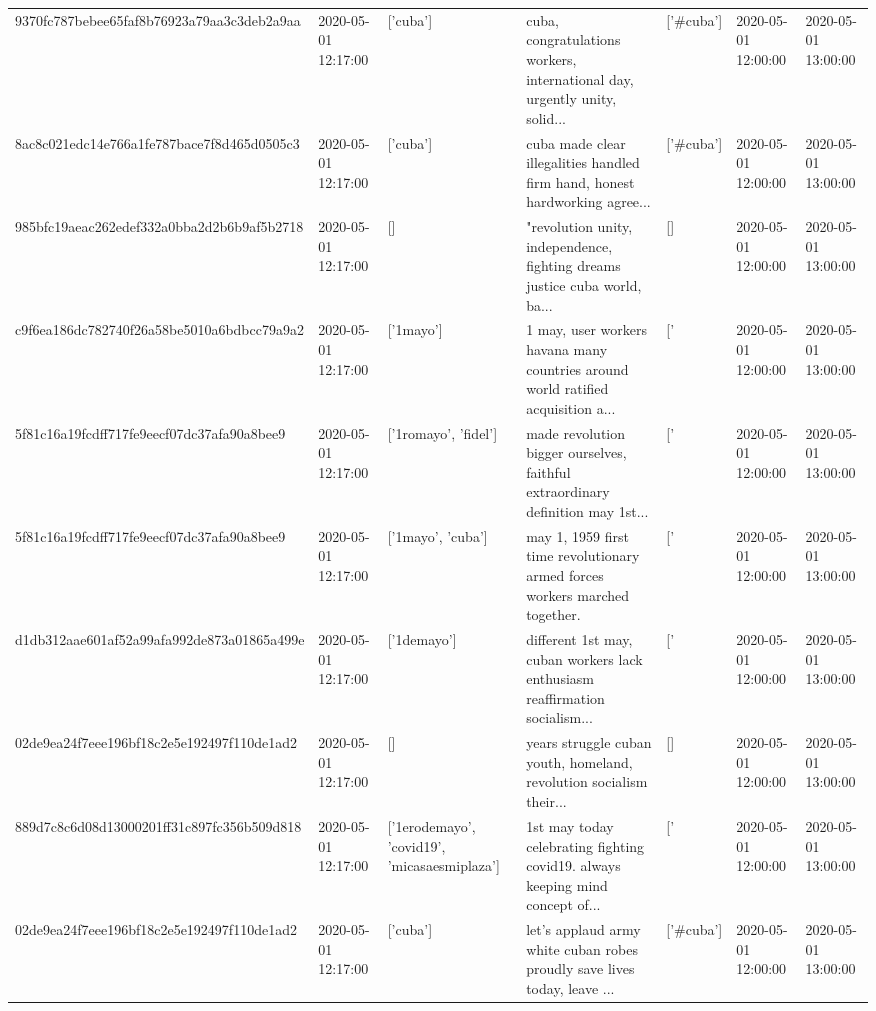 \begin{tabular}{lllllll}
9370fc787bebee65faf8b76923a79aa3c3deb2a9aa & 2020-05-01 12:17:00 & ['cuba'] & cuba, congratulations workers, international day, urgently unity, solid... & ['#cuba'] & 2020-05-01 12:00:00 & 2020-05-01 13:00:00 \\
8ac8c021edc14e766a1fe787bace7f8d465d0505c3 & 2020-05-01 12:17:00 & ['cuba'] & cuba made clear illegalities handled firm hand, honest hardworking agree... & ['#cuba'] & 2020-05-01 12:00:00 & 2020-05-01 13:00:00 \\
985bfc19aeac262edef332a0bba2d2b6b9af5b2718 & 2020-05-01 12:17:00 & [] & "revolution unity, independence, fighting dreams justice cuba world, ba... & [] & 2020-05-01 12:00:00 & 2020-05-01 13:00:00 \\
c9f6ea186dc782740f26a58be5010a6bdbcc79a9a2 & 2020-05-01 12:17:00 & ['1mayo'] & 1 may, user workers havana many countries around world ratified acquisition a... & ['#1mayo'] & 2020-05-01 12:00:00 & 2020-05-01 13:00:00 \\
5f81c16a19fcdff717fe9eecf07dc37afa90a8bee9 & 2020-05-01 12:17:00 & ['1romayo', 'fidel'] & made revolution bigger ourselves, faithful extraordinary definition may 1st... & ['#1romayo', '#fidel'] & 2020-05-01 12:00:00 & 2020-05-01 13:00:00 \\
5f81c16a19fcdff717fe9eecf07dc37afa90a8bee9 & 2020-05-01 12:17:00 & ['1mayo', 'cuba'] & may 1, 1959 first time revolutionary armed forces workers marched together. & ['#1mayo', '#cuba'] & 2020-05-01 12:00:00 & 2020-05-01 13:00:00 \\
d1db312aae601af52a99afa992de873a01865a499e & 2020-05-01 12:17:00 & ['1demayo'] & different 1st may, cuban workers lack enthusiasm reaffirmation socialism... & ['#1demayo'] & 2020-05-01 12:00:00 & 2020-05-01 13:00:00 \\
02de9ea24f7eee196bf18c2e5e192497f110de1ad2 & 2020-05-01 12:17:00 & [] & years struggle cuban youth, homeland, revolution socialism their... & [] & 2020-05-01 12:00:00 & 2020-05-01 13:00:00 \\
889d7c8c6d08d13000201ff31c897fc356b509d818 & 2020-05-01 12:17:00 & ['1erodemayo', 'covid19', 'micasaesmiplaza'] & 1st may today celebrating fighting covid19. always keeping mind concept of... & ['#1erodemayo', '#covid19', '#micasaesmiplaza'] & 2020-05-01 12:00:00 & 2020-05-01 13:00:00 \\
02de9ea24f7eee196bf18c2e5e192497f110de1ad2 & 2020-05-01 12:17:00 & ['cuba'] & let's applaud army white cuban robes proudly save lives today, leave ... & ['#cuba'] & 2020-05-01 12:00:00 & 2020-05-01 13:00:00 \\

\end{tabular}
